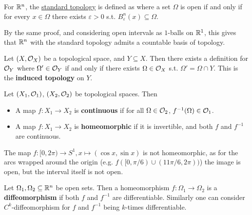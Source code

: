 \documentclass{article}
\begin{document}
\begin{remark}
    For $\mathbb{R}^n$, the \underline{standard topology} is defined as where a set $\Omega$ is open if and only if for every $x \in \Omega$ there exists $\varepsilon > 0$ s.t. $B_{\varepsilon}^n (x) \subseteq \Omega$. 
\end{remark}

\begin{corollary}
    By the same proof, and considering open intervals as $1$-balls on $\mathbb{R}^1$, this gives that $\mathbb{R}^n$ with the standard topology admits a countable basis of topology. 
\end{corollary}

\begin{definition}
    Let $(X, \mathcal{O}_X)$ be a topological space, and $Y \subseteq X$. Then there exists a definition for $\mathcal{O}_Y$ where $\Omega' \in \mathcal{O}_Y$ if and only if there exists $\Omega \in \mathcal{O}_X$ s.t. $\Omega' = \Omega \cap Y$. This is the \textbf{induced topology} on $Y$.
\end{definition}

\begin{definition}
    Let $(X_1, \mathcal{O}_1)$, $(X_2, \mathcal{O}_2)$ be topological spaces. Then
    \begin{itemize}
        \item A map $f: X_1 \to X_2$ is \textbf{continuous} if for all $\Omega \in \mathcal{O}_2$, $f^{-1}(\Omega) \in \mathcal{O}_1$. 
        \item A map $f: X_1 \to X_2$ is \textbf{homeomorphic} if it is invertible, and both $f$ and $f^{-1}$ are continuous. 
    \end{itemize}
\end{definition}

\begin{example}
    The map $f: [0, 2\pi) \to S^1, x \mapsto (\cos x, \sin x)$ is not homeomorphic, as for the arcs wrapped around the origin (e.g. $f([0, \pi/6) \cup (11\pi/6, 2\pi))$) the image is open, but the interval itself is not open.
\end{example}

\begin{definition}[Diffeomorphism]
    Let $\Omega_1, \Omega_2 \subseteq \mathbb{R}^n$ be open sets. Then a homeomorphism $f: \Omega_1 \to \Omega_2$ is a \textbf{diffeomorphism} if both $f$ and $f^{-1}$ are differentiable. Similarly one can consider $C^k$-diffeomorphism for $f$ and $f^{-1}$ being $k$-times differentiable.
\end{definition}
\end{document}
